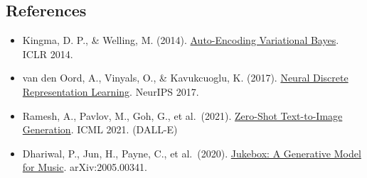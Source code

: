 \FloatBarrier
{}
\hypertarget{references-40}{%
\subsection{References}\label{references-40}}

\vspace{0.25em}
\begin{itemize}
\tightlist
\item
  Kingma, D. P., \& Welling, M. (2014). \href{https://arxiv.org/abs/1312.6114}{Auto-Encoding Variational Bayes}. ICLR 2014.
\item
  van den Oord, A., Vinyals, O., \& Kavukcuoglu, K. (2017). \href{https://arxiv.org/abs/1711.00937}{Neural Discrete Representation Learning}. NeurIPS 2017.
\item
  Ramesh, A., Pavlov, M., Goh, G., et al.~(2021). \href{https://arxiv.org/abs/2102.12092}{Zero-Shot Text-to-Image Generation}. ICML 2021. (DALL-E)
\item
  Dhariwal, P., Jun, H., Payne, C., et al.~(2020). \href{https://arxiv.org/abs/2005.00341}{Jukebox: A Generative Model for Music}. arXiv:2005.00341.
\end{itemize}

\clearpage

